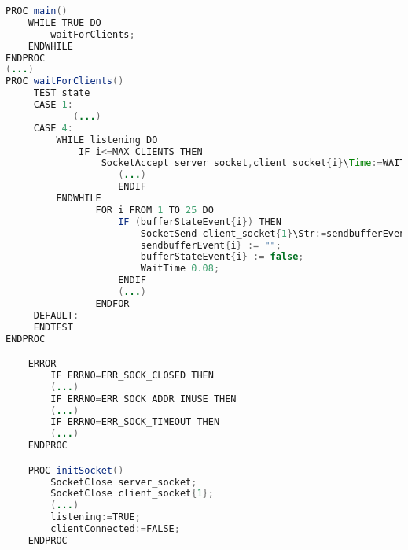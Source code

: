 \label{abbCode:moduleServerComm}
\begin{lstlisting}[language=java, caption=Task ServerComm - Modul ServerComm]
PROC main()
    WHILE TRUE DO
        waitForClients;
    ENDWHILE
ENDPROC    
(...)
PROC waitForClients()
     TEST state
     CASE 1:
			(...)
     CASE 4:			
         WHILE listening DO
             IF i<=MAX_CLIENTS THEN					
                 SocketAccept server_socket,client_socket{i}\Time:=WAIT_MAX;    
					(...)
					ENDIF
         ENDWHILE
 				FOR i FROM 1 TO 25 DO
 					IF (bufferStateEvent{i}) THEN
 						SocketSend client_socket{1}\Str:=sendbufferEvent{i};
 						sendbufferEvent{i} := "";
 						bufferStateEvent{i} := false;
 						WaitTime 0.08;
 					ENDIF					
					(...)										
 				ENDFOR
     DEFAULT:
     ENDTEST   
ENDPROC    

    ERROR
        IF ERRNO=ERR_SOCK_CLOSED THEN
		(...)
        IF ERRNO=ERR_SOCK_ADDR_INUSE THEN
		(...)
        IF ERRNO=ERR_SOCK_TIMEOUT THEN
		(...)
    ENDPROC

    PROC initSocket()
        SocketClose server_socket;
        SocketClose client_socket{1};
		(...)
        listening:=TRUE;
		clientConnected:=FALSE; 
    ENDPROC
\end{lstlisting}
